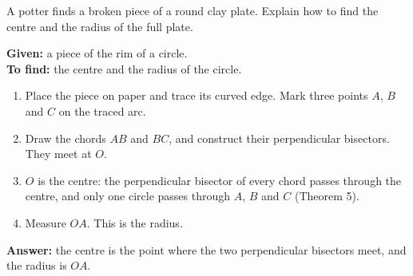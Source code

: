 
\begin{example}
A potter finds a broken piece of a round clay plate. Explain how to find the centre and the radius of the full plate.
\end{example}


\textbf{Given:} a piece of the rim of a circle.\\
\textbf{To find:} the centre and the radius of the circle.
\begin{enumerate}[leftmargin=1.8em,itemsep=1pt]
  \item Place the piece on paper and trace its curved edge. Mark three points $A$, $B$ and $C$ on the traced arc.
  \item Draw the chords $AB$ and $BC$, and construct their perpendicular bisectors. They meet at $O$.
  \item $O$ is the centre: the perpendicular bisector of every chord passes through the centre, and only one circle passes through $A$, $B$ and $C$ (Theorem 5).
  \item Measure $OA$. This is the radius.
\end{enumerate}
\textbf{Answer:} the centre is the point where the two perpendicular bisectors meet, and the radius is $OA$.

